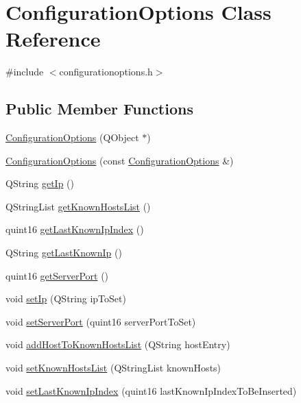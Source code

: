 \hypertarget{class_configuration_options}{
\section{ConfigurationOptions Class Reference}
\label{class_configuration_options}
}


{\ttfamily \#include $<$configurationoptions.h$>$}

\subsection*{Public Member Functions}
\begin{DoxyCompactItemize}
\item 
\hyperlink{class_configuration_options_a680dac4365cd1f2aa5dbc800028bfa47}{ConfigurationOptions} (QObject $\ast$)
\item 
\hyperlink{class_configuration_options_a6b493d24d9402069c24db13df801ed14}{ConfigurationOptions} (const \hyperlink{class_configuration_options}{ConfigurationOptions} \&)
\item 
QString \hyperlink{class_configuration_options_a89963fb150da246532d0bdfbef207408}{getIp} ()
\item 
QStringList \hyperlink{class_configuration_options_a36319761ca5639f4c3c45ea5949842c0}{getKnownHostsList} ()
\item 
quint16 \hyperlink{class_configuration_options_a2aa15a85d8dfa0b3641c4a214c64997d}{getLastKnownIpIndex} ()
\item 
QString \hyperlink{class_configuration_options_ad33f2bbc68b25def00317c43d1ede26d}{getLastKnownIp} ()
\item 
quint16 \hyperlink{class_configuration_options_a438e2c552c162fd8a4519aa3e4b1b0f4}{getServerPort} ()
\item 
void \hyperlink{class_configuration_options_aa6fb6a8abebe10abc83d56c8e238f8ec}{setIp} (QString ipToSet)
\item 
void \hyperlink{class_configuration_options_a3db64a191544db35136970a41a8ba06a}{setServerPort} (quint16 serverPortToSet)
\item 
void \hyperlink{class_configuration_options_ae1ff02f7ba10a58a05a16c68bceacc97}{addHostToKnownHostsList} (QString hostEntry)
\item 
void \hyperlink{class_configuration_options_a202aeecd48633ccd66a9d6036243e1c1}{setKnownHostsList} (QStringList knownHosts)
\item 
void \hyperlink{class_configuration_options_ae626cfca501b8c8e5ea44db2dd5c7daa}{setLastKnownIpIndex} (quint16 lastKnownIpIndexToBeInserted)

\end{DoxyCompactItemize}
